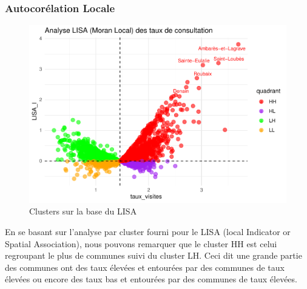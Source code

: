\documentclass[
]{article}
\begin{document}
\subsubsection{Autocorélation Locale}\label{autocoruxe9lation-locale}

\begin{figure}

{\centering \includegraphics{4_Analyse_Descriptive_files/figure-latex/unnamed-chunk-22-1} 

}

\caption{Clusters sur la base du LISA}\label{fig:unnamed-chunk-22}
\end{figure}

En se basant sur l'analyse par cluster fourni pour le LISA (local
Indicator or Spatial Association), nous pouvons remarquer que le cluster
HH est celui regroupant le plus de communes suivi du cluster LH. Ceci
dit une grande partie des communes ont des taux élevées et entourées par
des communes de taux élevées ou encore des taux bas et entourées par des
communes de taux élevées.
\end{document}
